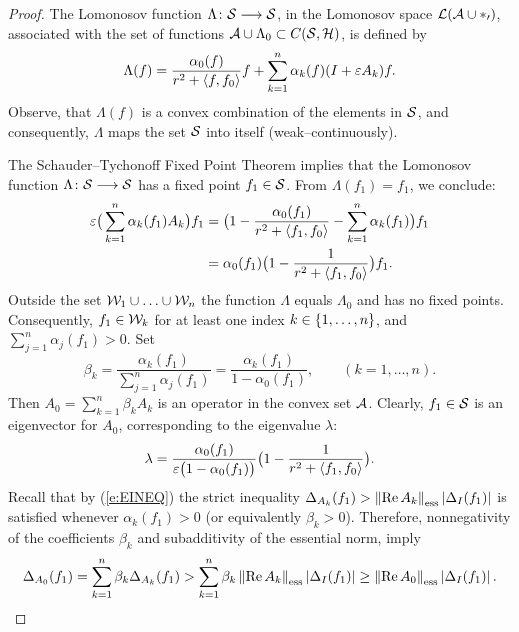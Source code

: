 \begin{proof}
\smallskip

The Lomonosov function $\Lambda\colon{\cal S}\longrightarrow{\cal S}$, in the Lomonosov space
$\cal{L}({{\cal A}\cup\Lambda_0})$, associated with the set of functions
${\cal A}\cup\Lambda_0\subset{}C({\cal S},{\cal H})$, is defined by
\[ \Lambda(f) = \frac{\alpha_0(f)}{r^2+\left<f,f_0\right>} f +
   \sum_{k=1}^n \alpha_k(f) (I+\varepsilon A_k)f. \]
Observe, that $\Lambda(f)$ is a convex combination of the elements in ${\cal S}$,
and consequently, $\Lambda$ maps the set ${\cal S}$ into itself
(weak--continuously).

\def\baselinestretch{1.66}
\goodbreak

The Schauder--Tychonoff Fixed Point Theorem implies that the Lomonosov
function $\Lambda\colon{\cal S}\longrightarrow{\cal S}$ has a fixed point $f_1\in{\cal S}$. From
$\Lambda(f_1)=f_1$, we conclude:
\begin{equation*}
  \begin{split}
     \varepsilon \big(\sum_{k=1}^n \alpha_k(f_1) A_k\big)f_1 & =
     \big(1-\frac{\alpha_0(f_1)}{r^2+\left<f_1,f_0\right>} -
     \sum_{k=1}^n \alpha_k(f_1)\big)f_1 \\
     & = \alpha_0(f_1)\big(1 -  \frac{1}{r^2+\left<f_1,f_0\right>}\big)f_1.
  \end{split}
\end{equation*}
Outside the set ${\cal W}_1\cup\ldots\cup{\cal W}_n$ the function $\Lambda$ equals
$\Lambda_0$ and has no fixed points. Consequently, $f_1\in{\cal W}_k$ for at least
one index $k\in\left\{1,\ldots,n\right\}$, and $\sum_{j=1}^n\alpha_j(f_1)>0$. Set
\[ \beta_k=\frac{\alpha_k(f_1)}{\sum_{j=1}^n \alpha_j(f_1)}=
           \frac{\alpha_k(f_1)}{1-\alpha_0(f_1)},
           \qquad (k=1,\ldots,n). \]
Then $A_0=\sum_{k=1}^n \beta_k A_k$ is an operator in the convex set ${\cal A}$.
Clearly, $f_1\in{\cal S}$ is an eigenvector for $A_0$, corresponding to the
eigenvalue $\lambda$:
\begin{equation}\label{e:LAMBDA}
   \lambda = \frac{\alpha_0(f_1)}{\eps\big(1-\alpha_0(f_1)\big)}\big(1 -
   \frac{1}{r^2+\seq{f_1,f_0}}\big).
\end{equation}
Recall that by (\ref{e:EINEQ}) the strict inequality $\Delta_{A_k}(f_1) >
\essnorm{\RE{}A_k}\abs{\Delta_I(f_1)}$ is satisfied whenever
$\alpha_k(f_1)>0$ (or equivalently $\beta_k>0$). Therefore, nonnegativity of
the coefficients $\beta_k$ and subadditivity of the essential norm, imply
\begin{equation*}
   \Delta_{A_0}(f_1) =
   \sum_{k=1}^n \beta_k \Delta_{A_k}(f_1)
   > \sum_{k=1}^n \beta_k \essnorm{\RE{}A_k}\abs{\Delta_I(f_1)}
   \geq \essnorm{\RE{}A_0}\abs{\Delta_I(f_1)}.
\end{equation*}

\end{proof}
